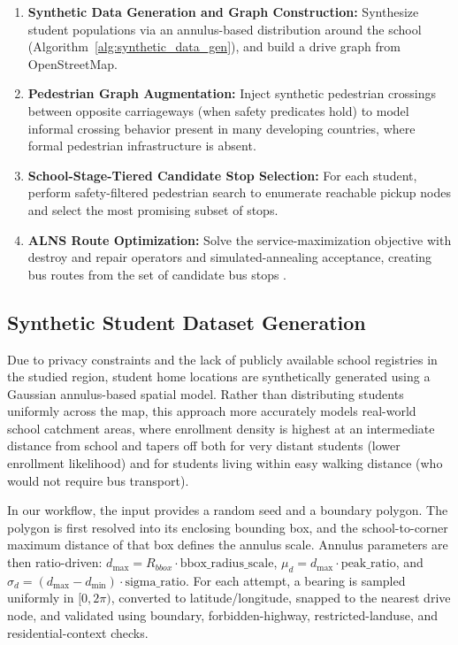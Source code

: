 \documentclass[journal]{IEEEtran}
\begin{document}
\begin{enumerate}

\item \textbf{Synthetic Data Generation and Graph Construction:} 
Synthesize student populations via an annulus-based distribution 
around the school (Algorithm~\ref{alg:synthetic_data_gen}), and 
build a drive graph from OpenStreetMap.

\item \textbf{Pedestrian Graph Augmentation:} Inject synthetic 
pedestrian crossings between opposite carriageways (when safety 
predicates hold) to model informal crossing behavior present in 
many developing countries, where formal pedestrian infrastructure 
is absent.

\item \textbf{School-Stage-Tiered Candidate Stop Selection:} For 
each student, perform safety-filtered pedestrian search to 
enumerate reachable pickup nodes and select the most promising 
subset of stops.

\item \textbf{ALNS Route Optimization:} Solve the 
service-maximization objective with destroy and repair operators 
and simulated-annealing acceptance, creating bus routes from the 
set of candidate bus stops \cite{c9}.

\end{enumerate}

\subsection{Synthetic Student Dataset Generation}

Due to privacy constraints and the lack of publicly available school 
registries in the studied region, student home locations are 
synthetically generated using a Gaussian annulus-based spatial 
model. Rather than distributing students uniformly across the map, 
this approach more accurately models real-world school catchment 
areas, where enrollment density is highest at an intermediate 
distance from school and tapers off both for very distant students 
(lower enrollment likelihood) and for students living within easy 
walking distance (who would not require bus transport).

In our workflow, the input provides a random seed and a boundary 
polygon. The polygon is first resolved into its enclosing bounding 
box, and the school-to-corner maximum distance of that box defines 
the annulus scale. Annulus parameters are then ratio-driven: 
$d_{\max}=R_{bbox}\cdot\text{bbox\_radius\_scale}$, 
$\mu_d=d_{\max}\cdot\text{peak\_ratio}$, and 
$\sigma_d=(d_{\max}-d_{\min})\cdot\text{sigma\_ratio}$. 
For each attempt, a bearing is sampled uniformly in $[0,2\pi)$, 
converted to latitude/longitude, snapped to the nearest drive node, and validated using boundary, forbidden-highway, 
restricted-landuse, and residential-context checks.
\end{document}

